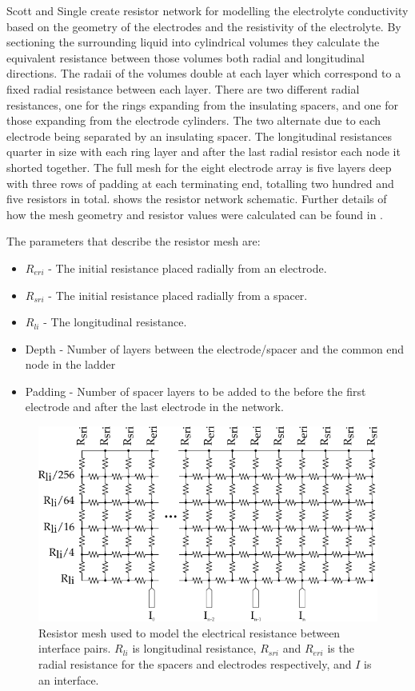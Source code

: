     Scott and Single create resistor network for modelling the electrolyte conductivity based on the geometry of the electrodes and the resistivity of the electrolyte.
    By sectioning the surrounding liquid into cylindrical volumes they calculate the equivalent resistance between those volumes both radial and longitudinal directions.
    The radaii of the volumes double at each layer which correspond to a fixed radial resistance between each layer.
    There are two different radial resistances, one for the rings expanding from the insulating spacers, and one for those expanding from the electrode cylinders.
    The two alternate due to each electrode being separated by an insulating spacer.
    The longitudinal resistances quarter in size with each ring layer and after the last radial resistor each node it shorted together.
    The full mesh for the eight electrode array is five layers deep with three rows of padding at each terminating end, totalling two hundred and five resistors in total.
     shows the resistor network schematic.
    Further details of how the mesh geometry and resistor values were calculated can be found in \cite{Scott2014}.

    The parameters that describe the resistor mesh are:
    \begin{itemize}
    \item $R_{eri}$ - The initial resistance placed radially from an electrode.
    \item $R_{sri}$ - The initial resistance placed radially from a spacer.
    \item $R_{li}$ - The longitudinal resistance.
    \item Depth - Number of layers between the electrode/spacer and the common end node in the ladder
    \item Padding - Number of spacer layers to be added to the before the first electrode and after the last electrode in the network.
    \end{itemize}

    \begin{figure}
      \centering
      \includegraphics{content/pt2/07-InterfaceModel/graphics/resistorMesh}
      \caption{\label{fig:pt2-ResistorMesh}Resistor mesh used to model the electrical resistance between interface pairs. $R_{li}$ is longitudinal resistance, $R_{sri}$ and $R_{eri}$ is the radial resistance for the spacers and electrodes respectively, and $I$ is an interface.}
    \end{figure}

